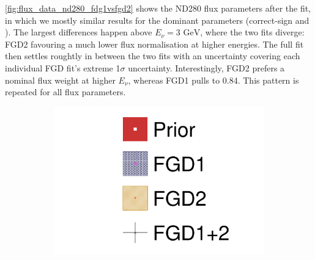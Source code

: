 \autoref{fig:flux_data_nd280_fdg1vsfgd2} shows the ND280 flux parameters after the fit, in which we mostly similar results for the dominant parameters (correct-sign \numu and \nue). The largest differences happen above $E_\nu=3\text{ GeV}$, where the two fits diverge: FGD2 favouring a much lower flux normalisation at higher energies. The full fit then settles roughtly in between the two fits with an uncertainty covering each individual FGD fit's extreme 1$\sigma$ uncertainty. Interestingly, FGD2 prefers a nominal flux weight at higher $E_\nu$, whereas FGD1 pulls to 0.84. This pattern is repeated for all flux parameters.
\begin{figure}[h]
	\begin{subfigure}[t]{0.10\textwidth}
		\includegraphics[width=\textwidth, trim={0mm 0mm 0mm 0mm}, clip,page=1]{figures/mach3/data/alt/2017b_FGD1_Data_merge_2017b_FGD2_Data_merge_2017b_NewData_NewDet_UpdXsecStep_2Xsec_4Det_5Flux_0}
	\end{subfigure}
	

\end{figure}
